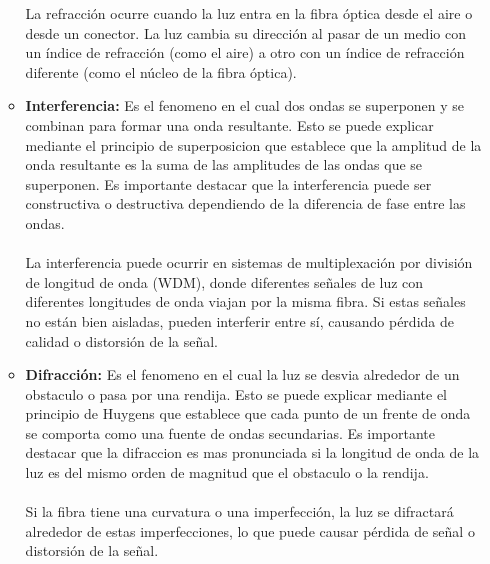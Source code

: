 \begin{enumerate}
\begin{itemize}
	La refracción ocurre cuando la luz entra en la fibra óptica desde el aire o desde un conector. La luz cambia su dirección al pasar de un medio con un índice de refracción (como el aire) a otro con un índice de refracción diferente (como el núcleo de la fibra óptica).
	\item \textbf{Interferencia:} Es el fenomeno en el cual dos ondas se superponen y se combinan para formar una onda resultante. Esto se puede explicar mediante el principio de superposicion que establece que la amplitud de la onda resultante es la suma de las amplitudes de las ondas que se superponen. Es importante destacar que la interferencia puede ser constructiva o destructiva dependiendo de la diferencia de fase entre las ondas.\\\\
	La interferencia puede ocurrir en sistemas de multiplexación por división de longitud de onda (WDM), donde diferentes señales de luz con diferentes longitudes de onda viajan por la misma fibra. Si estas señales no están bien aisladas, pueden interferir entre sí, causando pérdida de calidad o distorsión de la señal.

	\item \textbf{Difracción:} Es el fenomeno en el cual la luz se desvia alrededor de un obstaculo o pasa por una rendija. Esto se puede explicar mediante el principio de Huygens que establece que cada punto de un frente de onda se comporta como una fuente de ondas secundarias. Es importante destacar que la difraccion es mas pronunciada si la longitud de onda de la luz es del mismo orden de magnitud que el obstaculo o la rendija.\\\\
	Si la fibra tiene una curvatura o una imperfección, la luz se difractará alrededor de estas imperfecciones, lo que puede causar pérdida de señal o distorsión de la señal.
	

\end{itemize}
\end{enumerate}
